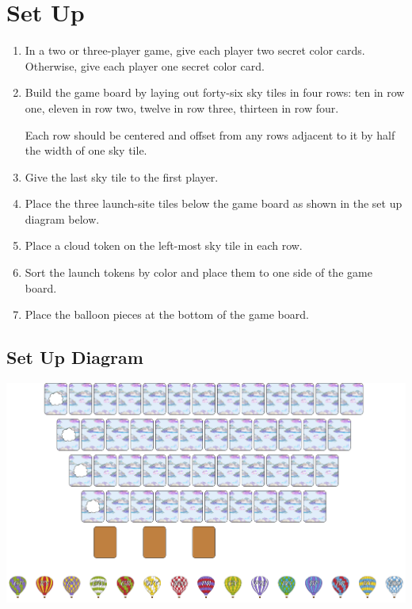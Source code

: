 \documentclass[a6paper, 11pt, parskip=half, DIV=15]{scrartcl}
\begin{document}
\section*{Set Up}
\begin{enumerate}

  \item In a two or three-player game, give each player two secret color cards. Otherwise, give each player one secret color card.
 
  \item Build the game board by laying out forty-six sky tiles in four rows: ten in row one, eleven in row two, twelve in row three, thirteen in row four.
  
  Each row should be centered and offset from any rows adjacent to it by half the width of one sky tile.
  
  \item Give the last sky tile to the first player.
  
  \item Place the three launch-site tiles below the game board as shown in the set up diagram below.
  
  \item Place a cloud token on the left-most sky tile in each row.

  \item Sort the launch tokens by color and place them to one side of the game board.

  \item Place the balloon pieces at the bottom of the game board. 

\end{enumerate}

\newpage
\enlargethispage{1.75\baselineskip}

\subsection*{Set Up Diagram}

\begin{center}
\includegraphics[width=\textwidth]{Images/set_up_diagram2.png}
\end{center}
\end{document}
